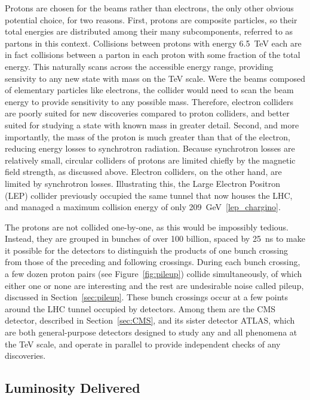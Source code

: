   Protons are chosen for the beams rather than electrons, the only other obvious potential choice, for two reasons.
  First, protons are composite particles, so their total energies are distributed among their many subcomponents, referred to as partons in this context.
  Collisions between protons with energy 6.5~TeV each are in fact collisions between a parton in each proton with some fraction of the total energy.
  This naturally scans across the accessible energy range, providing sensivity to any new state with mass on the TeV scale.
  Were the beams composed of elementary particles like electrons, the collider would need to scan the beam energy to provide sensitivity to any possible mass.
  Therefore, electron colliders are poorly suited for new discoveries compared to proton colliders, and better suited for studying a state with known mass in greater detail.
  Second, and more importantly, the mass of the proton is much greater than that of the electron, reducing energy losses to synchrotron radiation.
  Because synchrotron losses are relatively small, circular colliders of protons are limited chiefly by the magnetic field strength, as discussed above.
  Electron colliders, on the other hand, are limited by synchrotron losses.
  Illustrating this, the Large Electron Positron (LEP) collider previously occupied the same tunnel that now houses the LHC, and managed a maximum collision energy of only 209~GeV~\ref{lep_chargino}.

  The protons are not collided one-by-one, as this would be impossibly tedious.
  Instead, they are grouped in bunches of over 100 billion, spaced by 25~ns to make it possible for the detectors to distinguish the products of one bunch crossing from those of the preceding and following crossings.
  During each bunch crossing, a few dozen proton pairs (see Figure~\ref{fig:pileup}) collide simultaneously, of which either one or none are interesting and the rest are undesirable noise called pileup, discussed in Section~\ref{sec:pileup}.
  These bunch crossings occur at a few points around the LHC tunnel occupied by detectors.
  Among them are the CMS detector, described in Section~\ref{sec:CMS}, and its sister detector ATLAS, which are both general-purpose detectors designed to study any and all phenomena at the TeV scale, and operate in parallel to provide independent checks of any discoveries.

  \subsection{Luminosity Delivered} \label{sec:lumi}

